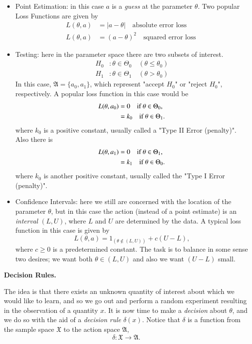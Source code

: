\documentclass[11pt,english]{scrbook}
\begin{document}
\begin{itemize}
\item Point Estimation: in this case \(a\) is a \emph{guess} at the parameter \(\theta\). Two popular Loss Functions are given by 
\begin{align*}
L(\theta,a) & =|a-\theta|\quad\mbox{absolute error loss}\\
L(\theta,a) & =(a-\theta)^{2}\quad\mbox{squared error loss }
\end{align*}

\item Testing: here in the parameter space there are two subsets of interest.
\begin{align*}
H_{0} & :\theta\in\Theta_{0}\quad(\theta\leq\theta_{0})\\
H_{1} & :\theta\in\Theta_{1}\quad(\theta>\theta_{0})
\end{align*}
In this case, \(\mathfrak{A}=\{a_{0},a_{1}\}\), which represent "accept \(H_{0}\)" or "reject \(H_{0}\)", respectively. A popular loss function in this case would be 
\begin{align*}
L(\theta,a_{0}) & =0\quad\mbox{if \ensuremath{\theta\in\Theta_{0}},}\\
& =k_{0}\quad\mbox{if \ensuremath{\theta\in\Theta_{1}}.}
\end{align*}
where \(k_{0}\) is a positive constant, usually called a "Type II Error (penalty)". Also there is 
  \begin{align*}
  L(\theta,a_{1}) & =0\quad\mbox{if \ensuremath{\theta\in\Theta_{1}},}\\
& =k_{1}\quad\mbox{if \ensuremath{\theta\in\Theta_{0}}.}
  \end{align*}
where \(k_{0}\) is another positive constant, usually called the "Type I Error (penalty)".

\item Confidence Intervals: here we still are concerned with the location of the parameter \(\theta\), but in this case the action (instead of a point estimate) is an \emph{interval} \((L,U)\), where \(L\) and \(U\) are determined by the data. A typical loss function in this case is given by 
\[
   L(\theta,a)=1_{(\theta\notin(L,U))}+c(U-L),
   \]
where \(c\geq0\) is a predetermined constant. The task is to balance in some sense two desires; we want both \(\theta\in(L,U)\) and also we want \((U-L)\) small.
\end{itemize}

\textbf{Decision Rules.}

The idea is that there exists an unknown quantity of interest about which we would like to learn, and so we go out and perform a random experiment resulting in the observation of a quantity \(x\). It is now time to make a \emph{decision} about \(\theta\), and we do so with the aid of a \emph{decision rule} \(\delta(x)\). Notice that \(\delta\) is a function from the sample space \(\mathfrak{X}\) to the action space
\(\mathfrak{A}\), 
\[
\delta:\mathfrak{X}\to\mathfrak{A}.
\]
\end{document}
